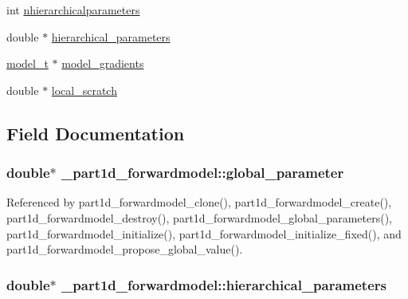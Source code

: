 \begin{DoxyCompactItemize}
\item 
int \hyperlink{struct__part1d__forwardmodel_a9a5f62d025d12d04c1d78a28293b34fa}{nhierarchicalparameters}
\item 
double $\ast$ \hyperlink{struct__part1d__forwardmodel_ae3c8c3213ca1f7476c9c3f674f5791ca}{hierarchical\+\_\+parameters}
\item 
\hyperlink{part1d__forwardmodel_8c_a0a038e31b1f765296a40c2da07b46a84}{model\+\_\+t} $\ast$ \hyperlink{struct__part1d__forwardmodel_a5ba03ec9048f0f0951a34f84cb5f2390}{model\+\_\+gradients}
\item 
double $\ast$ \hyperlink{struct__part1d__forwardmodel_ae6d9de256a99543ea1c339564c4bd6b4}{local\+\_\+scratch}
\end{DoxyCompactItemize}


\subsection{Field Documentation}
\subsubsection[{\texorpdfstring{global\+\_\+parameter}{global_parameter}}]{\setlength{\rightskip}{0pt plus 5cm}double$\ast$ \+\_\+part1d\+\_\+forwardmodel\+::global\+\_\+parameter}\hypertarget{struct__part1d__forwardmodel_af5129b3777d22503d75f5c3442e536c5}{}\label{struct__part1d__forwardmodel_af5129b3777d22503d75f5c3442e536c5}


Referenced by part1d\+\_\+forwardmodel\+\_\+clone(), part1d\+\_\+forwardmodel\+\_\+create(), part1d\+\_\+forwardmodel\+\_\+destroy(), part1d\+\_\+forwardmodel\+\_\+global\+\_\+parameters(), part1d\+\_\+forwardmodel\+\_\+initialize(), part1d\+\_\+forwardmodel\+\_\+initialize\+\_\+fixed(), and part1d\+\_\+forwardmodel\+\_\+propose\+\_\+global\+\_\+value().

\subsubsection[{\texorpdfstring{hierarchical\+\_\+parameters}{hierarchical_parameters}}]{\setlength{\rightskip}{0pt plus 5cm}double$\ast$ \+\_\+part1d\+\_\+forwardmodel\+::hierarchical\+\_\+parameters}\hypertarget{struct__part1d__forwardmodel_ae3c8c3213ca1f7476c9c3f674f5791ca}{}\label{struct__part1d__forwardmodel_ae3c8c3213ca1f7476c9c3f674f5791ca}


